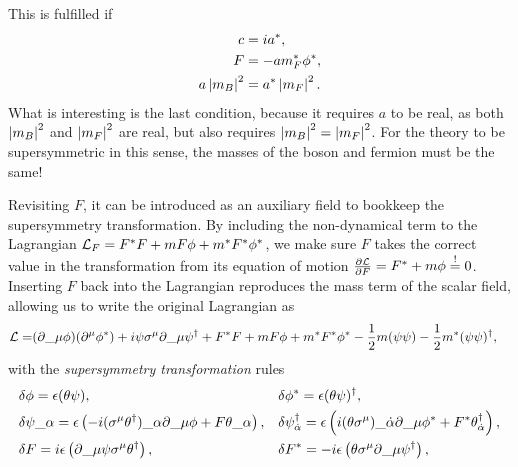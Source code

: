 \documentclass[../main.tex]{subfiles}
\begin{document}
This is fulfilled if
\begin{subequations}
    \begin{align}
        c            & = i a^\ast,              \\
        F            & = -a m_F^\ast \phi^\ast, \\
        a\abs{m_B}^2 & = a^\ast \abs{m_F}^2.
    \end{align}
\end{subequations}
What is interesting is the last condition, because it requires \(a\) to be real, as both \(\abs{m_B}^2\) and \(\abs{m_F}^2\) are real, but also requires \(\abs{m_B}^2 = \abs{m_F}^2\).
For the theory to be supersymmetric in this sense, the masses of the boson and fermion must be the same!

Revisiting \(F\), it can be introduced as an auxiliary field to bookkeep the
supersymmetry transformation. By including the non-dynamical term to the
Lagrangian \(\L_F = F^\ast F + m F \phi + m^\ast F^\ast \phi^\ast\), we make
sure \(F\) takes the correct value in the transformation from its equation of
motion \(\pd[F]{\L} = F^\ast + m \phi \mbeq 0\). Inserting \(F\) back into the
Lagrangian reproduces the mass term of the scalar field, allowing us to write
the original Lagrangian as
\begin{align}
    \L = & (\partial\_{\mu} \phi)(\partial\^{\mu}\phi^\ast) + i \psi \sigma\^{\mu} \partial\_{\mu} \psi^\dagger + F^\ast F + m F \phi + m^\ast F^\ast \phi^\ast - \frac{1}{2}m (\psi\psi) - \frac{1}{2}m^\ast (\psi\psi)^\dagger,
\end{align}
with the \emph{supersymmetry transformation} rules
\begin{subequations}
    \begin{align}
         & \delta\phi       = \epsilon (\theta \psi),                                                                                                                                       &
         & \delta\phi^\ast = \epsilon (\theta\psi)^\dagger,                                                                                                                                   \\
         & \delta\psi\_{\alpha} = \epsilon \pclosed{-i(\sigma\^{\mu} \theta^\dagger)\_{\alpha} \partial\_{\mu} \phi  + F \theta\_{\alpha}},                                                 &
         & \delta\psi\indices*{^\dagger_{\dot\alpha}} = \epsilon \pclosed{i(\theta \sigma\^{\mu})\_{\dot\alpha} \partial\_{\mu} \phi^\ast + F^\ast \theta\indices*{^\dagger_{\dot\alpha}}},   \\
         & \delta F         = i \epsilon \pclosed{\partial\_{\mu} \psi \sigma\^{\mu} \theta^\dagger},                                                                                       &
         & \delta F^\ast = -i \epsilon \pclosed{\theta \sigma\^{\mu} \partial\_{\mu} \psi^\dagger},
    \end{align}
\end{subequations}
\end{document}
